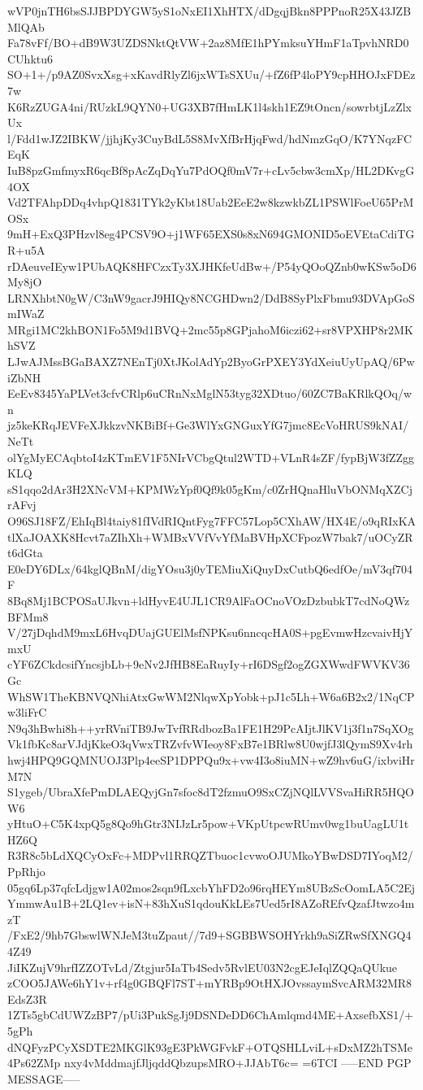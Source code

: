 wVP0jnTH6bsSJJBPDYGW5yS1oNxEI1XhHTX/dDgqjBkn8PPPnoR25X43JZBMlQAb
Fa78vFf/BO+dB9W3UZDSNktQtVW+2az8MfE1hPYmksuYHmF1aTpvhNRD0CUhktu6
SO+1+/p9AZ0SvxXsg+xKavdRlyZl6jxWTsSXUu/+fZ6fP4loPY9cpHHOJxFDEz7w
K6RzZUGA4ni/RUzkL9QYN0+UG3XB7fHmLK1l4skh1EZ9tOncn/sowrbtjLzZlxUx
l/Fdd1wJZ2IBKW/jjhjKy3CuyBdL5S8MvXfBrHjqFwd/hdNmzGqO/K7YNqzFCEqK
IuB8pzGmfmyxR6qcBf8pAcZqDqYu7PdOQf0mV7r+cLv5cbw3cmXp/HL2DKvgG4OX
Vd2TFAhpDDq4vhpQ1831TYk2yKbt18Uab2EeE2w8kzwkbZL1PSWlFoeU65PrMOSx
9mH+ExQ3PHzvl8eg4PCSV9O+j1WF65EXS0s8xN694GMONID5oEVEtaCdiTGR+u5A
rDAeuveIEyw1PUbAQK8HFCzxTy3XJHKfeUdBw+/P54yQOoQZnb0wKSw5oD6My8jO
LRNXhbtN0gW/C3nW9gacrJ9HIQy8NCGHDwn2/DdB8SyPlxFbmu93DVApGoSmIWaZ
MRgi1MC2khBON1Fo5M9d1BVQ+2mc55p8GPjahoM6iczi62+sr8VPXHP8r2MKhSVZ
LJwAJMssBGaBAXZ7NEnTj0XtJKolAdYp2ByoGrPXEY3YdXeiuUyUpAQ/6PwiZbNH
EeEv8345YaPLVet3cfvCRlp6uCRnNxMglN53tyg32XDtuo/60ZC7BaKRlkQOq/wn
jz5keKRqJEVFeXJkkzvNKBiBf+Ge3WlYxGNGuxYfG7jmc8EcVoHRUS9kNAI/NeTt
olYgMyECAqbtoI4zKTmEV1F5NIrVCbgQtul2WTD+VLnR4sZF/fypBjW3fZZggKLQ
sS1qqo2dAr3H2XNcVM+KPMWzYpf0Qf9k05gKm/c0ZrHQnaHluVbONMqXZCjrAFvj
O96SJ18FZ/EhIqBl4taiy81fIVdRIQntFyg7FFC57Lop5CXhAW/HX4E/o9qRIxKA
tlXaJOAXK8Hcvt7aZIhXh+WMBxVVfVvYfMaBVHpXCFpozW7bak7/uOCyZRt6dGta
E0eDY6DLx/64kglQBnM/digYOsu3j0yTEMiuXiQuyDxCutbQ6edfOe/mV3qf704F
8Bq8Mj1BCPOSaUJkvn+ldHyvE4UJL1CR9AlFaOCnoVOzDzbubkT7cdNoQWzBFMm8
V/27jDqhdM9mxL6HvqDUajGUElMsfNPKsu6nncqcHA0S+pgEvmwHzcvaivHjYmxU
cYF6ZCkdcsifYncsjbLb+9eNv2JfHB8EaRuyIy+rI6DSgf2ogZGXWwdFWVKV36Gc
WhSW1TheKBNVQNhiAtxGwWM2NlqwXpYobk+pJ1c5Lh+W6a6B2x2/1NqCPw3liFrC
N9q3hBwhi8h++yrRVniTB9JwTvfRRdbozBa1FE1H29PcAIjtJlKV1j3f1n7SqXOg
Vk1fbKc8arVJdjKkeO3qVwxTRZvfvWIeoy8FxB7e1BRlw8U0wjfJ3lQymS9Xv4rh
hwj4HPQ9GQMNUOJ3Plp4eeSP1DPPQu9x+vw4I3o8iuMN+wZ9hv6uG/ixbviHrM7N
S1ygeb/UbraXfePmDLAEQyjGn7sfoc8dT2fzmuO9SxCZjNQlLVVSvaHiRR5HQOW6
yHtuO+C5K4xpQ5g8Qo9hGtr3NIJzLr5pow+VKpUtpcwRUmv0wg1buUagLU1tHZ6Q
R3R8c5bLdXQCyOxFc+MDPvl1RRQZTbuoc1cvwoOJUMkoYBwDSD7IYoqM2/PpRhjo
05gq6Lp37qfcLdjgw1A02mos2sqn9fLxcbYhFD2o96rqHEYm8UBzScOomLA5C2Ej
YmmwAu1B+2LQ1ev+isN+83hXuS1qdouKkLEs7Ued5rI8AZoREfvQzafJtwzo4mzT
/FxE2/9hb7GbswlWNJeM3tuZpaut//7d9+SGBBWSOHYrkh9aSiZRwSfXNGQ44Z49
JiIKZujV9hrfIZZOTvLd/Ztgjur5IaTb4Sedv5RvlEU03N2cgEJeIqlZQQaQUkue
zCOO5JAWe6hY1v+rf4g0GBQFl7ST+mYRBp9OtHXJOvssaymSvcARM32MR8EdsZ3R
1ZTs5gbCdUWZzBP7/pUi3PukSgJj9DSNDeDD6ChAmlqmd4ME+AxsefbXS1/+5gPh
dNQFyzPCyXSDTE2MKGlK93gE3PkWGFvkF+OTQSHLLviL+sDxMZ2hTSMe4Ps62ZMp
nxy4vMddmajfJljqddQbzupsMRO+JJAbT6c=
=6TCI
-----END PGP MESSAGE-----
